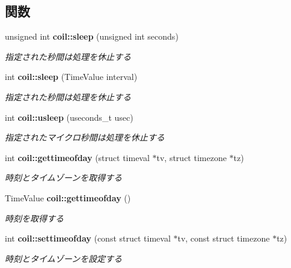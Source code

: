 \subsection*{関数}
\begin{DoxyCompactItemize}
\item 
unsigned int {\bf coil::sleep} (unsigned int seconds)
\begin{DoxyCompactList}\small\item\em 指定された秒間は処理を休止する \item\end{DoxyCompactList}\item 
int {\bf coil::sleep} (TimeValue interval)
\begin{DoxyCompactList}\small\item\em 指定された秒間は処理を休止する \item\end{DoxyCompactList}\item 
int {\bf coil::usleep} (useconds\_\-t usec)
\begin{DoxyCompactList}\small\item\em 指定されたマイクロ秒間は処理を休止する \item\end{DoxyCompactList}\item 
int {\bf coil::gettimeofday} (struct timeval $\ast$tv, struct timezone $\ast$tz)
\begin{DoxyCompactList}\small\item\em 時刻とタイムゾーンを取得する \item\end{DoxyCompactList}\item 
TimeValue {\bf coil::gettimeofday} ()
\begin{DoxyCompactList}\small\item\em 時刻を取得する \item\end{DoxyCompactList}\item 
int {\bf coil::settimeofday} (const struct timeval $\ast$tv, const struct timezone $\ast$tz)
\begin{DoxyCompactList}\small\item\em 時刻とタイムゾーンを設定する \item\end{DoxyCompactList}\end{DoxyCompactItemize}
